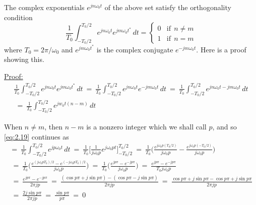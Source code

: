 \documentclass[10pt]{article}
\begin{document}
\vspace{2mm}


\noindent
The complex exponentials $e^{jn\omega_0t}$ of the above set satisfy the orthogonality condition
\[ \frac{1}{T_0}\int_{-T_0/2}^{T_0/2} e^{jn\omega_0t} e^{jm\omega_0t^{\ast}} \,dt = \begin{cases} 0 & \text{if} \:\: n \neq m \\ 1 & \text{if} \:\: n = m \end{cases}\] where $T_0 = 2\pi / \omega_0$ and $e^{jm\omega_0t^{\ast}}$ is the complex conjugate $e^{-jm\omega_0t}$. Here is a proof showing this.

\hspace{1cm}

\noindent
\underline{Proof:}
\begin{equation}   \label{eq:2.19}
\begin{aligned}
    \frac{1}{T_0}\int_{-T_0/2}^{T_0/2} e^{jn\omega_0t} e^{jm\omega_0t^{\ast}} \,dt \: = \:
    \frac{1}{T_0}\int_{-T_0/2}^{T_0/2} e^{jn\omega_0t} e^{-jm\omega_0t} \,dt \: = \:
    \frac{1}{T_0}\int_{-T_0/2}^{T_0/2} e^{jn\omega_0t-jm\omega_0t} \,dt \\
    \: = \: \frac{1}{T_0}\int_{-T_0/2}^{T_0/2} e^{jw_0t(n-m)} \,dt
\end{aligned}
\end{equation}

\noindent
When $n \neq m$, then $n - m$ is a nonzero integer which we shall call $p$, and so \eqref{eq:2.19} continues as
\begin{equation} \label{eq:2.20}
\begin{aligned}
    = \: 
    \frac{1}{T_0}\int_{-T_0/2}^{T_0/2} e^{jp\omega_0t} \,dt \: = \:
    \frac{1}{T_0}\Big[\frac{1}{j\omega_0p} e^{j\omega_0pt}\Big]_{-T_0/2}^{T_0/2} \: = \:
    \frac{1}{T_0}\Big(\frac{e^{j\omega_0p(T_0/2)}}{j\omega_0p} - \frac{e^{j\omega_0p(-T_0/2)}}{j\omega_0p}\Big) \\
    \: = \: \frac{1}{T_0}\Big(\frac{e^{(j\omega_0pT_0)/2}-e^{(-j\omega_0pT_0)/2}}{j\omega_0p}\Big) \: = \: \frac{1}{T_0}\Big(\frac{e^{jp\pi}-e^{-jp\pi}}{j\omega_0p}\Big) \: = \: \frac{e^{jp\pi}-e^{-jp\pi}}{T_0j\omega_0p} \\
    \: = \: \frac{e^{jp\pi}-e^{-jp\pi}}{2\pi j p} \: = \: \frac{(\cos{p\pi}+j\sin{p\pi}) - (\cos{p\pi}-j\sin{p\pi})}{2 \pi j p} \: = \: \frac{\cos{p\pi}+j\sin{p\pi}-\cos{p\pi}+j\sin{p\pi}}{2 \pi j p} \\
    \: = \: \frac{2j\sin{p\pi}}{2\pi j p} \: = \: \frac{\sin{p\pi}}{p\pi} \: = \: 0
\end{aligned}
\end{equation}
\end{document}

